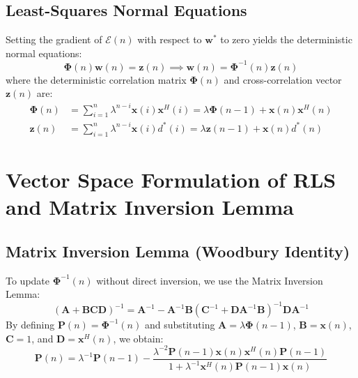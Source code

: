 \documentclass[12pt,a4paper]{article}
\begin{document}
\subsection{Least-Squares Normal Equations}
Setting the gradient of $\mathcal{E}(n)$ with respect to $\mathbf{w}^*$ to zero yields the deterministic normal equations:
\begin{equation}
  \mathbf{\Phi}(n) \mathbf{w}(n) = \mathbf{z}(n) \implies \mathbf{w}(n) = \mathbf{\Phi}^{-1}(n) \mathbf{z}(n)
\end{equation}
where the deterministic correlation matrix $\mathbf{\Phi}(n)$ and cross-correlation vector $\mathbf{z}(n)$ are:
\begin{align}
  \mathbf{\Phi}(n) &= \sum_{i=1}^n \lambda^{n-i} \mathbf{x}(i) \mathbf{x}^H(i) = \lambda \mathbf{\Phi}(n-1) + \mathbf{x}(n) \mathbf{x}^H(n) \\
  \mathbf{z}(n) &= \sum_{i=1}^n \lambda^{n-i} \mathbf{x}(i) d^*(i) = \lambda \mathbf{z}(n-1) + \mathbf{x}(n) d^*(n)
\end{align}

\section{Vector Space Formulation of RLS and Matrix Inversion Lemma}

\subsection{Matrix Inversion Lemma (Woodbury Identity)}
To update $\mathbf{\Phi}^{-1}(n)$ without direct inversion, we use the Matrix Inversion Lemma:
\begin{equation}
  (\mathbf{A} + \mathbf{B}\mathbf{C}\mathbf{D})^{-1} = \mathbf{A}^{-1} - \mathbf{A}^{-1}\mathbf{B}(\mathbf{C}^{-1} + \mathbf{D}\mathbf{A}^{-1}\mathbf{B})^{-1}\mathbf{D}\mathbf{A}^{-1}
\end{equation}
By defining $\mathbf{P}(n) = \mathbf{\Phi}^{-1}(n)$ and substituting $\mathbf{A} = \lambda \mathbf{\Phi}(n-1)$, $\mathbf{B} = \mathbf{x}(n)$, $\mathbf{C} = 1$, and $\mathbf{D} = \mathbf{x}^H(n)$, we obtain:
\begin{equation}
  \mathbf{P}(n) = \lambda^{-1} \mathbf{P}(n-1) - \frac{\lambda^{-2}\mathbf{P}(n-1)\mathbf{x}(n)\mathbf{x}^H(n)\mathbf{P}(n-1)}{1 + \lambda^{-1}\mathbf{x}^H(n)\mathbf{P}(n-1)\mathbf{x}(n)}
\end{equation}
\end{document}
